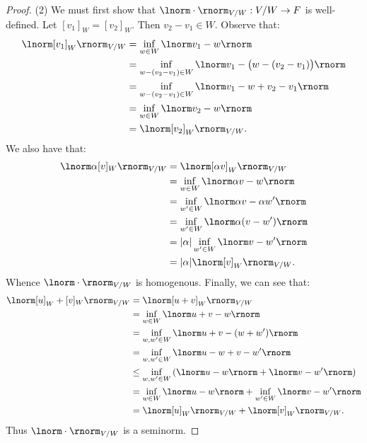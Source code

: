 \documentclass[11pt,twoside,openany]{memoir}
\begin{document}
{\begin{proof}
            (2) We must first show that $\lnorm \cdot \rnorm_{V/W} : V/W \rightarrow F$ is well-defined. Let $[v_1]_W  = [v_2]_W$. Then $v_2 - v_1 \in W$. Observe that:
                \begin{equation*}
                \begin{split}
                    \lnorm [v_1]_W \rnorm_{V/W}
                    & = \inf_{w \in W} \lnorm v_1 - w \rnorm \\
                    & = \inf_{w - (v_2 - v_1) \in W} \lnorm v_1 - \bigl(w - (v_2 - v_1)\bigr) \rnorm  \\
                    & = \inf_{w - (v_2 - v_1) \in W} \lnorm v_1 - w + v_2 - v_1 \rnorm \\
                    & = \inf_{w \in W}\lnorm v_2 - w\rnorm \\
                    & = \lnorm [v_2]_W \rnorm_{V/W}.
                \end{split}
                \end{equation*}
            We also have that:
                \begin{equation*}
                \begin{split}
                    \lnorm \alpha [v]_W \rnorm_{V/W}
                    & = \lnorm [\alpha v]_W \rnorm_{V/W} \\
                    & = \inf_{w \in W}\lnorm \alpha v - w \rnorm \\
                    & = \inf_{w' \in W} \lnorm \alpha v - \alpha w' \rnorm \\
                    & = \inf_{w' \in W} \lnorm \alpha (v-w') \rnorm \\
                    & = |\alpha| \inf_{w' \in W} \lnorm v - w' \rnorm \\
                    & = |\alpha| \lnorm [v]_W \rnorm_{V/W}.
                \end{split}
                \end{equation*}
            Whence $\lnorm \cdot \rnorm_{V/W}$ is homogenous. Finally, we can see that:
                \begin{equation*}
                \begin{split}
                    \lnorm [u]_W + [v]_W \rnorm_{V/W}
                    & = \lnorm [u+v]_W \rnorm_{V/W} \\
                    & = \inf_{w \in W} \lnorm u+v - w \rnorm \\
                    & = \inf_{w,w' \in W} \lnorm u + v - (w + w') \rnorm \\
                    & = \inf_{w,w' \in W} \lnorm u-w + v-w' \rnorm \\
                    & \leq \inf_{w,w' \in W} \left( \lnorm  u-w\rnorm +  \lnorm v - w' \rnorm\right) \\
                    & = \inf_{w \in W}\lnorm u-w \rnorm + \inf_{w' \in W} \lnorm v - w' \rnorm \\
                    & = \lnorm [u]_W \rnorm_{V/W} + \lnorm [v]_W \rnorm_{V/W}.
                \end{split}
                \end{equation*}
            Thus $\lnorm \cdot \rnorm_{V/W}$ is a seminorm.
        \end{proof}}
\end{document}
